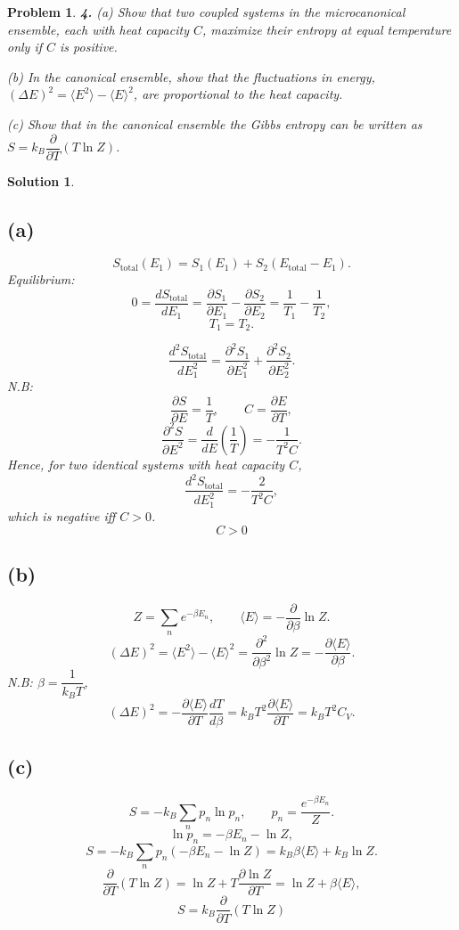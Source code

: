 \documentclass[11pt]{article}
\newtheorem*{problem}{Problem}
\newtheorem*{solution}{Solution}
\begin{document}
\begin{problem}
\textbf{4.} (a) Show that two coupled systems in the microcanonical ensemble, each with heat
capacity $C$, maximize their entropy at equal temperature only if $C$ is positive.

(b) In the canonical ensemble, show that the fluctuations in energy,
$(\Delta E)^2 = \langle E^2\rangle - \langle E\rangle^2$, are proportional to the heat capacity.

(c) Show that in the canonical ensemble the Gibbs entropy can be written as
$S = k_B\dfrac{\partial}{\partial T}(T\ln Z)$.
\end{problem}

\begin{solution}
\subsection*{(a)}
\[
S_{\text{total}}(E_1)=S_1(E_1)+S_2(E_{\text{total}}-E_1).
\]
Equilibrium:
\[
0=\frac{dS_{\text{total}}}{dE_1}
=\frac{\partial S_1}{\partial E_1}-\frac{\partial S_2}{\partial E_2}
=\frac1{T_1}-\frac1{T_2},
\]
\[
T_1=T_2.
\]

\[
\frac{d^2S_{\text{total}}}{dE_1^2}
=\frac{\partial^2 S_1}{\partial E_1^2}+\frac{\partial^2 S_2}{\partial E_2^2}.
\]
N.B:
\[
\frac{\partial S}{\partial E}=\frac1T,
\qquad
C=\frac{\partial E}{\partial T},
\]
\[
\frac{\partial^2 S}{\partial E^2}
=\frac{d}{dE}\!\left(\frac1T\right)
=-\frac{1}{T^2C}.
\]
Hence, for two identical systems with heat capacity \(C\),
\[
\frac{d^2S_{\text{total}}}{dE_1^2}=-\frac{2}{T^2C},
\]
which is negative iff \(C>0\).
\[
\boxed{C>0}
\]

\subsection*{(b)}
\[
Z=\sum_n e^{-\beta E_n},\qquad
\langle E\rangle=-\frac{\partial}{\partial\beta}\ln Z.
\]
\[
(\Delta E)^2
=\langle E^2\rangle-\langle E\rangle^2
=\frac{\partial^2}{\partial\beta^2}\ln Z
=-\frac{\partial\langle E\rangle}{\partial\beta}.
\]
N.B: \(\beta=\dfrac{1}{k_BT}\),
\[
(\Delta E)^2
=-\frac{\partial\langle E\rangle}{\partial T}\frac{dT}{d\beta}
=k_BT^2\frac{\partial\langle E\rangle}{\partial T}
=\boxed{k_BT^2C_V}.
\]

\subsection*{(c)}
\[
S=-k_B\sum_n p_n\ln p_n,\qquad
p_n=\frac{e^{-\beta E_n}}{Z}.
\]
\[
\ln p_n=-\beta E_n-\ln Z,
\]
\[
S=-k_B\sum_n p_n(-\beta E_n-\ln Z)
=k_B\beta\langle E\rangle+k_B\ln Z.
\]
\[
\frac{\partial}{\partial T}(T\ln Z)
=\ln Z+T\frac{\partial\ln Z}{\partial T}
=\ln Z+\beta\langle E\rangle,
\]
\[
\boxed{S=k_B\frac{\partial}{\partial T}(T\ln Z)}
\]
\end{solution}
\end{document}
